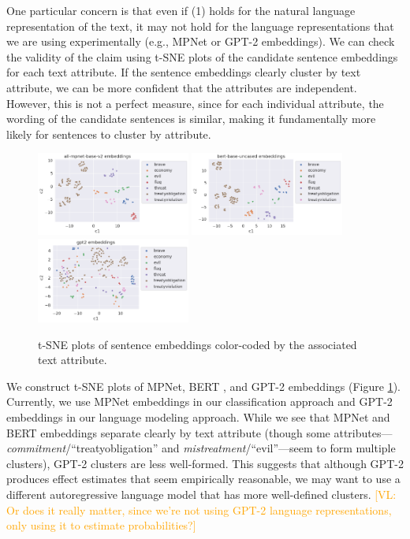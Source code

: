 \documentclass{article}
\newcommand{\vl}[1]{\textcolor{orange}{[VL: #1]}}
\begin{document}
One particular concern is that even if (1) holds for the natural language representation of the text, it may not hold for the language representations that we are using experimentally (e.g., MPNet or GPT-2 embeddings). We can check the validity of the claim using t-SNE plots of the candidate sentence embeddings for each text attribute. If the sentence embeddings clearly cluster by text attribute, we can be more confident that the attributes are independent. However, this is not a perfect measure, since for each individual attribute, the wording of the candidate sentences is similar, making it fundamentally more likely for sentences to cluster by attribute.

\begin{figure}
    \centering
    \includegraphics[width=0.45\textwidth]{plots/sanity_check/all-mpnet-base-v2.png}
    \includegraphics[width=0.45\textwidth]{plots/sanity_check/bert-base-uncased.png}
    \includegraphics[width=0.45\textwidth]{plots/sanity_check/gpt2.png}
    \caption{t-SNE plots of sentence embeddings color-coded by the associated text attribute.}
    \label{fig:alias_check}
\end{figure}

We construct t-SNE plots of MPNet, BERT \cite{devlin2019bert}, and GPT-2 embeddings (Figure \ref{fig:alias_check}). Currently, we use MPNet embeddings in our classification approach and GPT-2 embeddings in our language modeling approach. While we see that MPNet and BERT embeddings separate clearly by text attribute (though some attributes--- \textit{commitment}/``treatyobligation'' and \textit{mistreatment}/``evil''---seem to form multiple clusters), GPT-2 clusters are less well-formed. This suggests that although GPT-2 produces effect estimates that seem empirically reasonable, we may want to use a different autoregressive language model that has more well-defined clusters. \vl{Or does it really matter, since we're not using GPT-2 language representations, only using it to estimate probabilities?}
\end{document}

